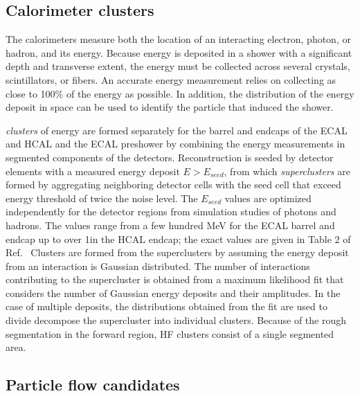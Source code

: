 \subsection{Calorimeter clusters}
The calorimeters measure both the location of an interacting
electron, photon, or hadron, and its energy. Because energy is deposited
in a shower with a significant depth and transverse extent, the energy
must be collected across several crystals, scintillators, or fibers.
An accurate energy measurement relies on collecting
as close to 100\% of the energy as possible. In addition, the distribution
of the energy deposit in space can be used to identify the particle
that induced the shower.

\emph{clusters} of energy are formed separately for the 
barrel and endcaps of the ECAL and HCAL and the 
ECAL preshower by combining the energy measurements in segmented
components of the detectors. 
Reconstruction is seeded by detector elements with a measured energy deposit
$E>E_{seed}$, from which \emph{superclusters} are formed
by aggregating neighboring detector cells with the seed cell that exceed
energy threshold of twice the noise level. The $E_{seed}$ values are optimized 
independently for the detector regions 
from simulation studies of photons and hadrons.
The values range 
from a few hundred MeV for the ECAL barrel and endcap up to over 1\GeV in the HCAL
endcap; the exact values are given in Table 2 of Ref.~\cite{CMS-PRF-14-001}
Clusters are formed from the superclusters by assuming the energy
deposit from an interaction is Gaussian distributed. The number of interactions
contributing to the supercluster is obtained from a maximum likelihood fit
that considers the number of Gaussian energy deposits and their amplitudes.
In the case of multiple deposits, the distributions obtained from the fit
are used to divide decompose the supercluster into individual clusters.
Because of the rough segmentation in the
forward region, HF clusters consist of a single segmented area.

\subsection{Particle flow candidates}
\label{sec:pfcandidates}

